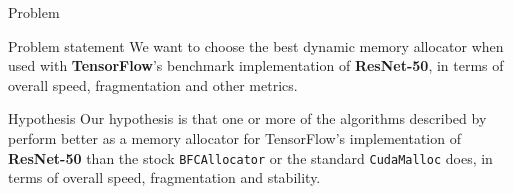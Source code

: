 \documentclass[10pt]{beamer}
\begin{document}



\begin{frame}[fragile]{Problem}


\begin{alertblock}{Problem statement}
 We want to choose the best dynamic memory allocator when used with \textbf{TensorFlow}'s benchmark implementation of \textbf{ResNet-50}, in terms of overall speed, fragmentation and other metrics.
\end{alertblock}

\begin{exampleblock}{Hypothesis}
Our hypothesis is that one or more of the algorithms described by \citeauthor{Vinkler2015} perform better as a memory allocator for TensorFlow's implementation of \textbf{ResNet-50} than the stock \texttt{BFCAllocator} or the standard \texttt{CudaMalloc} does, in terms of overall speed, fragmentation and stability.
\end{exampleblock}


\end{frame}
\end{document}
